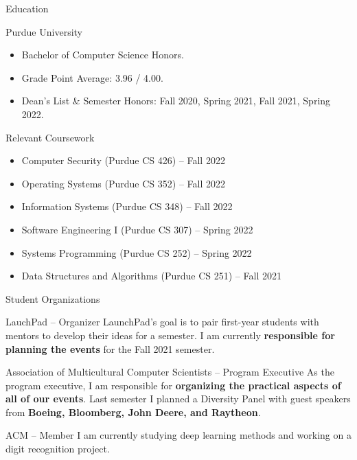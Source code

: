 \documentclass{article}
\newlength{\tabin}
\newlength{\secsep}
\newcommand{\lineunder}{\vspace*{-8pt} \\ \hspace*{-6pt} \hrulefill \\ \vspace*{-15pt}}
\newenvironment{tabbedsection}[1]{
  \begin{list}{}{
      \setlength{\itemsep}{0pt}
      \setlength{\labelsep}{0pt}
      \setlength{\labelwidth}{0pt}
      \setlength{\leftmargin}{\tabin}
      \setlength{\rightmargin}{\tabin}
      \setlength{\listparindent}{0pt}
      \setlength{\parsep}{0pt}
      \setlength{\parskip}{0pt}
      \setlength{\partopsep}{0pt}
      \setlength{\topsep}{#1}
    }
  \item[]
}{\end{list}}
\newenvironment{resume_section}[1]{
  \filbreak
  \vspace{2\secsep}
  \textsc{\large#1}
  \lineunder
  \begin{tabbedsection}{\secsep}
}{\end{tabbedsection}}
\newenvironment{resume_subsection}[2][]{
  \textbf{#2} \hfill {\footnotesize #1} \hspace{2em}
  \begin{tabbedsection}{0.5\secsep}
}{\end{tabbedsection}}
\newenvironment{subitems}{
  \renewcommand{\labelitemi}{-}
  \begin{itemize}
      \setlength{\labelsep}{1em}
}{\end{itemize}}
\begin{document}
\begin{resume_section}{Education}
  
  \begin{resume_subsection}{Purdue University}
    
    \begin{subitems}
      \item Bachelor of Computer Science Honors.
      \item Grade Point Average: 3.96 / 4.00.  	
  	  \item Dean's List \& Semester Honors: Fall 2020, Spring 2021, Fall 2021, Spring 2022.
  	\end{subitems}
  	
  \end{resume_subsection}
  
  \begin{resume_subsection}[]{Relevant Coursework}
  	
	\begin{subitems}
		\item Computer Security (Purdue CS 426) -- Fall 2022
		\item Operating Systems (Purdue CS 352) -- Fall 2022
		\item Information Systems (Purdue CS 348) -- Fall 2022
		\item Software Engineering I (Purdue CS 307) -- Spring 2022
		\item Systems Programming (Purdue CS 252) -- Spring 2022
		\item Data Structures and Algorithms (Purdue CS 251) -- Fall 2021
	\end{subitems}  	
  	
  \end{resume_subsection}
  
\end{resume_section}

\begin{resume_section}{Student Organizations}

	\begin{resume_subsection}{LauchPad -- Organizer}
		LaunchPad's goal is to pair first-year students with mentors to develop their ideas for a semester. I am currently \textbf{responsible for planning the events} for the Fall 2021 semester.
	\end{resume_subsection}
	
	\begin{resume_subsection}{Association of Multicultural Computer Scientists -- Program Executive}
		As the program executive, I am responsible for\textbf{ organizing the practical aspects of all of our events}. Last semester I planned a Diversity Panel with guest speakers from \textbf{Boeing, Bloomberg, John Deere, and Raytheon}.
	\end{resume_subsection} 
	
	\begin{resume_subsection}{ACM -- Member}
		I am currently studying deep learning methods and working on a digit recognition project.
	\end{resume_subsection}
	
\end{resume_section}
\end{document}
